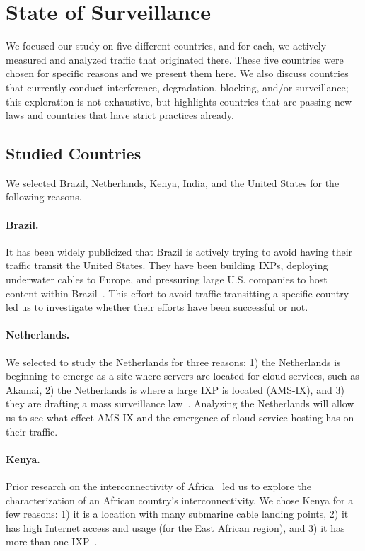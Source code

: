 \section{State of Surveillance}
\label{surv}
We focused our study on five different countries, and for each, we actively measured and analyzed traffic that originated there.  These five countries were chosen for specific reasons and we present them here.  We also discuss countries that currently conduct interference, degradation, blocking, and/or surveillance; this exploration is not exhaustive, but highlights countries that are passing new laws and countries that have strict practices already.   

\subsection{Studied Countries}
We selected Brazil, Netherlands, Kenya, India, and the United States for the following reasons.

\paragraph{Brazil.} It has been widely publicized that Brazil is actively trying to avoid having their traffic transit the United States.  They have been building IXPs, deploying underwater cables to Europe, and pressuring large U.S. companies to host content within Brazil~\cite{brazil_history, brazil_break_from_US, brazil_conference,
  brazil_conference2, brazil_human_rights, brazil_cable, brazil_us_companies, brazil_IXP1}.  This effort to avoid traffic transitting a specific country led us to investigate whether their efforts have been successful or not.

\paragraph{Netherlands.}  We selected to study the Netherlands for three reasons: 1) the Netherlands is beginning to emerge as a site where servers are located for cloud services, such as Akamai, 2) the Netherlands is where a large IXP is located (AMS-IX), and 3) they are drafting a mass surveillance law~\cite{netherlands_surveillance}. Analyzing the Netherlands will allow us to see what effect AMS-IX and the emergence of cloud service hosting has on their traffic.

\paragraph{Kenya.} Prior research on the interconnectivity of Africa~\cite{gupta2014peering, fanou2015diversity} led us to explore the characterization of an African country's interconnectivity.  We chose Kenya for a few reasons: 1) it is a location with many submarine cable landing points, 2) it has high Internet access and usage (for the East African region), and 3) it has more than one IXP~\cite{kenya_nigeria, teams}.

